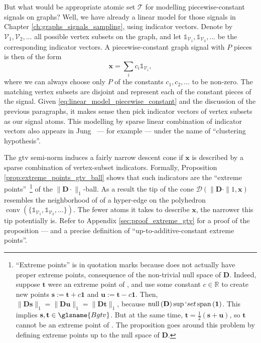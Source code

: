 But what would be appropriate atomic set $\mathcal{T}$ for modelling piecewise-constant signals on graphs? Well, we have already a linear model for those signals in Chapter \ref{ch:graphs_signals_sampling}, using indicator vectors. Denote by $\mathcal{V}_1, \mathcal{V}_2, \dots$ all possible vertex subsets on the graph, and let $\mathbb{1}_{\mathcal{V}_1}, \mathbb{1}_{\mathcal{V}_2}, \dots$ be the corresponding indicator vectors. A piecewise-constant graph signal with $P$ pieces is then of the form
\begin{equation}\label{eq:linear_model_piecewise_constant}
    \mathbf{x} = \sum_{i} c_i \mathbb{1}_{\mathcal{V}_i},
\end{equation}
where we can always choose only $P$ of the constants $c_1, c_2, \dots$ to be non-zero. The matching vertex subsets are disjoint and represent each of the constant pieces of the signal. Given \eqref{eq:linear_model_piecewise_constant} and the discussion of the previous paragraphs, it makes sense then pick indicator vectors of vertex subsets as our signal atoms. This modelling by sparse linear combination of indicator vectors also appears in Jung~\cite{jung2018} --- for example --- under the name of ``clustering hypothesis''.

The \acrshort{gtv} semi-norm induces a fairly narrow descent cone if $\mathbf{x}$ is described by a sparse combination of vertex-subset indicators. Formally, Proposition \ref{prop:extreme_points_gtv_ball} shows that such indicators are the ``extreme points''~\footnote{``Extreme points'' is in quotation marks because  does not actually have proper extreme points, consequence of the non-trivial null space of $\mathbf{D}$. Indeed, suppose $\mathbf{t}$ were an extreme point of , and use some constant $c \in \mathbb{R}$ to create new points $\mathbf{s} := \mathbf{t} + c\mathbf{1}$ and $\mathbf{u} := \mathbf{t} - c\mathbf{1}$. Then, $\|\mathbf{Ds}\|_1 = \|\mathbf{Du}\|_1 = \|\mathbf{Dt}\|_1$, because $\operatorname{null} \left ( \mathbf{D} \right) \sup `set \operatorname{span} \left ( \mathbf{1} \right )$. This implies $\mathbf{s,t} \in \glsname{Bgtv}$. But at the same time, $\mathbf{t} = \frac{1}{2} (\mathbf{s} + \mathbf{u})$, so $\mathbf{t}$ cannot be an extreme point of . The proposition goes around this problem by defining extreme points up to the null space of $\mathbf{D}$.} of the $\| \mathbf{D} \cdot \|_1$-ball. As a result the tip of the cone $\mathcal{D}(\|\mathbf{D} \cdot \|1, \mathbf{x})$ resembles the neighborhood of of a hyper-edge on the polyhedron $\operatorname{conv}(\{\mathbb{1}_{\mathcal{V}_1}, \mathbb{1}_{\mathcal{V}_2}, \dots\})$. The fewer atoms it takes to describe $\mathbf{x}$, the narrower this tip potentially is. Refer to Appendix \ref{sec:proof_extreme_gtv} for a proof of the proposition --- and a precise definition of ``up-to-additive-constant extreme points''.


